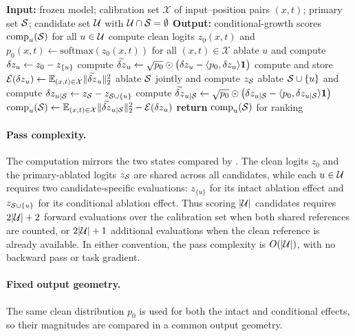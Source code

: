 \begin{algorithm}[ht]
\caption{\coax conditional co-ablation}
\label{alg:cond}
\begin{algorithmic}[1]
\STATE \textbf{Input:} frozen model; calibration set $\mathcal{X}$ of input--position pairs $(x,t)$; primary set $\mathcal{S}$; candidate set $\mathcal{U}$ with $\mathcal{U}\cap\mathcal{S}=\emptyset$
\STATE \textbf{Output:} conditional-growth scores $\mathrm{comp}_u(\mathcal{S})$ for all $u\in\mathcal{U}$
\STATE compute clean logits $z_0(x,t)$ and
$p_0(x,t)\leftarrow\mathrm{softmax}(z_0(x,t))$
for all $(x,t)\in\mathcal{X}$
  \STATE ablate $u$ and compute
  $\delta z_u\leftarrow z_0-z_{\{u\}}$
  \STATE compute
  $\widetilde{\delta z}_u
  \leftarrow
  \sqrt{p_0}\odot
  \bigl(\delta z_u-\langle p_0,\delta z_u\rangle\mathbf 1\bigr)$
  \STATE compute and store
  $\mathcal{E}(\delta z_u)
  \leftarrow
  \mathbb{E}_{(x,t)\in\mathcal{X}}
  \|\widetilde{\delta z}_u\|_2^2$
\ENDFOR
\STATE ablate $\mathcal{S}$ jointly and compute $z_{\mathcal{S}}$
  \STATE ablate $\mathcal{S}\cup\{u\}$ and compute
  $\delta z_{u\mid\mathcal{S}}
  \leftarrow
  z_{\mathcal{S}}-z_{\mathcal{S}\cup\{u\}}$
  \STATE compute
  $\widetilde{\delta z}_{u\mid\mathcal{S}}
  \leftarrow
  \sqrt{p_0}\odot
  \bigl(
  \delta z_{u\mid\mathcal{S}}
  -
  \langle p_0,\delta z_{u\mid\mathcal{S}}\rangle\mathbf 1
  \bigr)$
  \STATE
  $\mathrm{comp}_u(\mathcal{S})
  \leftarrow
  \mathbb{E}_{(x,t)\in\mathcal{X}}
  \|\widetilde{\delta z}_{u\mid\mathcal{S}}\|_2^2
  -
  \mathcal{E}(\delta z_u)$
\ENDFOR
\STATE \textbf{return} $\mathrm{comp}_u(\mathcal{S})$ for ranking
\end{algorithmic}
\end{algorithm}

\paragraph{Pass complexity.}
The computation mirrors the two states compared by \coax.
The clean logits $z_0$ and the primary-ablated logits $z_{\mathcal{S}}$ are shared
across all candidates, while each $u\in\mathcal{U}$ requires two candidate-specific
evaluations: $z_{\{u\}}$ for its intact ablation effect and
$z_{\mathcal{S}\cup\{u\}}$ for its conditional ablation effect.
Thus scoring $|\mathcal{U}|$ candidates requires $2|\mathcal{U}|+2$ forward evaluations
over the calibration set when both shared references are counted, or
$2|\mathcal{U}|+1$ additional evaluations when the clean reference is already
available.
In either convention, the pass complexity is $O(|\mathcal{U}|)$, with no backward
pass or task gradient.

\paragraph{Fixed output geometry.}
The same clean distribution $p_0$ is used for both the intact and conditional effects, so their magnitudes are compared in a common output geometry.

